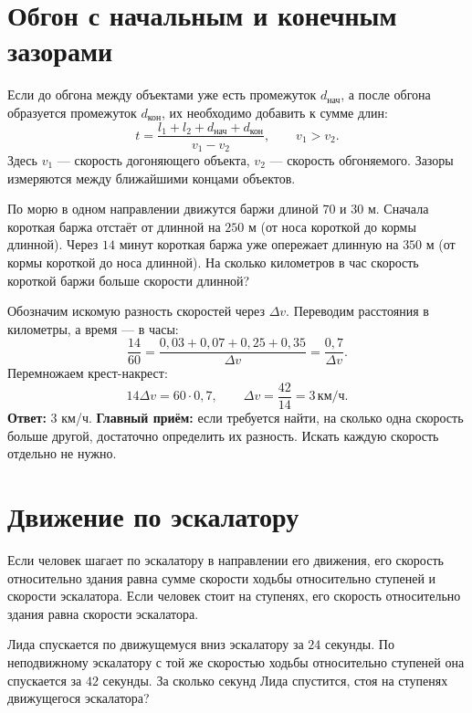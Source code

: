 \documentclass[a4paper,12pt]{article}
\newcommand{\topic}[1]{\par\medskip\noindent{\color{darkaccent}\textbf{#1}}\par\smallskip}
\newcommand{\unit}[1]{\,\text{#1}}
\newcommand{\ans}[1]{\textbf{Ответ:} #1.}
\begin{document}
\section{Обгон с начальным и конечным зазорами}
Если до обгона между объектами уже есть промежуток $d_{\text{нач}}$, а после обгона образуется промежуток $d_{\text{кон}}$, их необходимо добавить к сумме длин:
\[
 t=\frac{l_1+l_2+d_{\text{нач}}+d_{\text{кон}}}{v_1-v_2},\qquad v_1>v_2.
\]
Здесь $v_1$ --- скорость догоняющего объекта, $v_2$ --- скорость обгоняемого. Зазоры измеряются между ближайшими концами объектов.
\begin{center}
\end{center}
\topic{Пример 7. Две баржи}
По морю в одном направлении движутся баржи длиной $70$ и $30$ м. Сначала короткая баржа отстаёт от длинной на $250$ м (от носа короткой до кормы длинной). Через $14$ минут короткая баржа уже опережает длинную на $350$ м (от кормы короткой до носа длинной). На сколько километров в час скорость короткой баржи больше скорости длинной?

Обозначим искомую разность скоростей через $\Delta v$. Переводим расстояния в километры, а время --- в часы:
\[
 \frac{14}{60}=\frac{0,03+0,07+0,25+0,35}{\Delta v}
 =\frac{0,7}{\Delta v}.
\]
Перемножаем крест-накрест:
\[
 14\Delta v=60\cdot0,7,\qquad
 \Delta v=\frac{42}{14}=3\unit{км/ч}.
\]
\ans{3 км/ч}
\textbf{Главный приём:} если требуется найти, на сколько одна скорость больше другой, достаточно определить их разность. Искать каждую скорость отдельно не нужно.

\clearpage
\section{Движение по эскалатору}
Если человек шагает по эскалатору в направлении его движения, его скорость относительно здания равна сумме скорости ходьбы относительно ступеней и скорости эскалатора. Если человек стоит на ступенях, его скорость относительно здания равна скорости эскалатора.
\topic{Пример 8. Три способа спуска}
Лида спускается по движущемуся вниз эскалатору за $24$ секунды. По неподвижному эскалатору с той же скоростью ходьбы относительно ступеней она спускается за $42$ секунды. За сколько секунд Лида спустится, стоя на ступенях движущегося эскалатора?
\end{document}
